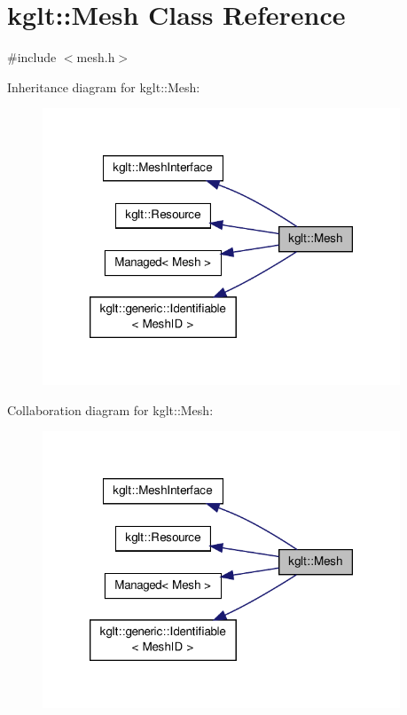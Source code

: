 \hypertarget{classkglt_1_1_mesh}{\section{kglt\-:\-:Mesh Class Reference}
\label{classkglt_1_1_mesh}
}


{\ttfamily \#include $<$mesh.\-h$>$}



Inheritance diagram for kglt\-:\-:Mesh\-:\nopagebreak
\begin{figure}[H]
\begin{center}
\leavevmode
\includegraphics[width=302pt]{classkglt_1_1_mesh__inherit__graph}
\end{center}
\end{figure}


Collaboration diagram for kglt\-:\-:Mesh\-:\nopagebreak
\begin{figure}[H]
\begin{center}
\leavevmode
\includegraphics[width=302pt]{classkglt_1_1_mesh__coll__graph}
\end{center}
\end{figure}
